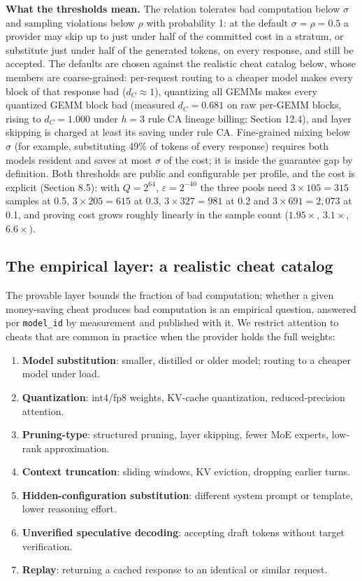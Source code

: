 \documentclass[10pt]{article}
\begin{document}
\textbf{What the thresholds mean.} The relation tolerates bad computation below $\sigma$ and sampling violations below $\rho$ with probability 1: at the default $\sigma=\rho=0.5$ a provider may skip up to just under half of the committed cost in a stratum, or substitute just under half of the generated tokens, on every response, and still be accepted. The defaults are chosen against the realistic cheat catalog below, whose members are coarse-grained: per-request routing to a cheaper model makes every block of that response bad ($d_C\approx1$), quantizing all GEMMs makes every quantized GEMM block bad (measured $d_C=0.681$ on raw per-GEMM blocks, rising to $d_C=1.000$ under $h=3$ rule CA lineage billing; Section 12.4), and layer skipping is charged at least its saving under rule CA. Fine-grained mixing below $\sigma$ (for example, substituting 49\% of tokens of every response) requires both models resident and saves at most $\sigma$ of the cost; it is inside the guarantee gap by definition. Both thresholds are public and configurable per profile, and the cost is explicit (Section 8.5): with $Q=2^{64}$, $\varepsilon=2^{-40}$ the three pools need $3\times105=315$ samples at 0.5, $3\times205=615$ at 0.3, $3\times327=981$ at 0.2 and $3\times691=2{,}073$ at 0.1, and proving cost grows roughly linearly in the sample count ($1.95\times$, $3.1\times$, $6.6\times$).

\subsection{The empirical layer: a realistic cheat catalog}
The provable layer bounds the fraction of bad computation; whether a given money-saving cheat produces bad computation is an empirical question, answered per \texttt{model\_\allowbreak{}id} by measurement and published with it. We restrict attention to cheats that are common in practice when the provider holds the full weights:

\begin{enumerate}
\item{} \textbf{Model substitution}: smaller, distilled or older model; routing to a cheaper model under load.
\item{} \textbf{Quantization}: int4/fp8 weights, KV-cache quantization, reduced-precision attention.
\item{} \textbf{Pruning-type}: structured pruning, layer skipping, fewer MoE experts, low-rank approximation.
\item{} \textbf{Context truncation}: sliding windows, KV eviction, dropping earlier turns.
\item{} \textbf{Hidden-configuration substitution}: different system prompt or template, lower reasoning effort.
\item{} \textbf{Unverified speculative decoding}: accepting draft tokens without target verification.
\item{} \textbf{Replay}: returning a cached response to an identical or similar request.
\end{enumerate}
\end{document}

